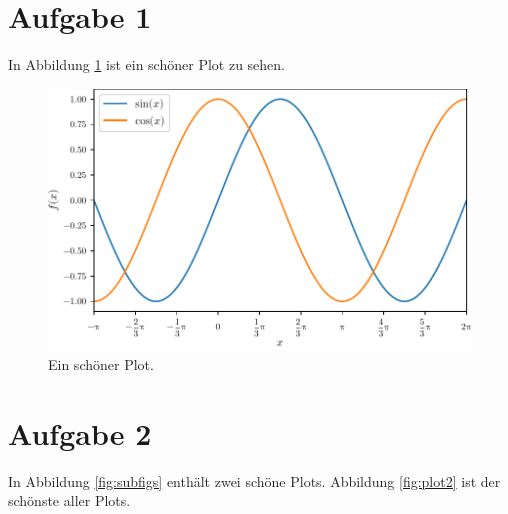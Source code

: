 \documentclass{scrartcl}
\begin{document}
\section*{Aufgabe 1}

In Abbildung \ref{fig:plot1} ist ein schöner Plot zu sehen.
\blindtext
\begin{figure}
  \centering
  \includegraphics[scale=1]{plot1.pdf}
  \caption{Ein schöner Plot.}
  \label{fig:plot1}
\end{figure}
\blindtext

\section*{Aufgabe 2}

In Abbildung \ref{fig:subfigs} enthält zwei schöne Plots.
Abbildung \ref{fig:plot2} ist der schönste aller Plots.
\end{document}
